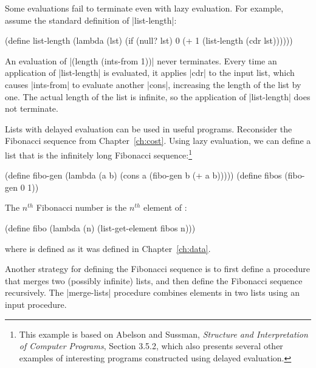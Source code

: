 \begin{schemeregion}
Some evaluations fail to terminate even with lazy evaluation.  For example, assume the standard definition of \scheme|list-length|:
\begin{schemedisplay}
(define list-length 
   (lambda (lst) (if (null? lst) 0 (+ 1 (list-length (cdr lst))))))
\end{schemedisplay}
An evaluation of \scheme|(length (ints-from 1))| never terminates.  Every time an application of \scheme|list-length| is evaluated, it applies \scheme|cdr| to the input list, which causes \scheme|ints-from| to evaluate another \scheme|cons|, increasing the length of the list by one.  The actual length of the list is infinite, so the application of \scheme|list-length| does not terminate.

Lists with delayed evaluation can be used in useful programs.  Reconsider the Fibonacci sequence from Chapter~\ref{ch:cost}.  Using lazy evaluation, we can define a list that is the infinitely long Fibonacci sequence:\footnote{This example is based on Abelson and Sussman, \emph{Structure and Interpretation of Computer Programs}, Section 3.5.2, which also presents several other examples of interesting programs constructed using delayed evaluation.}
\begin{schemedisplay}
(define fibo-gen (lambda (a b) (cons a (fibo-gen b (+ a b)))))
(define fibos (fibo-gen 0 1))
\end{schemedisplay}

The $n^{th}$ Fibonacci number is the $n^{th}$ element of :

\begin{schemedisplay}
(define fibo 
  (lambda (n) 
    (list-get-element fibos n)))
\end{schemedisplay}

where  is defined as it was defined in Chapter~\ref{ch:data}.

Another strategy for defining the Fibonacci sequence is to first define a procedure that merges two (possibly infinite) lists, and then define the Fibonacci sequence recursively.  The \scheme|merge-lists| procedure combines elements in two lists using an input procedure.


\end{schemeregion}
